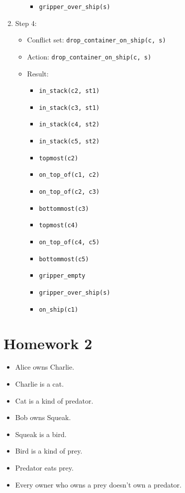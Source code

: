 \documentclass[12pt]{article}
\begin{document}
\begin{enumerate}
\begin{itemize}
\begin{itemize}
          \item \texttt{gripper\_over\_ship(s)}
        \end{itemize}
    \end{itemize}
  \item Step 4:
    \begin{itemize}
      \item Conflict set: \texttt{drop\_container\_on\_ship(c, s)}
      \item Action: \texttt{drop\_container\_on\_ship(c, s)}
      \item Result:
        \begin{itemize}
          \item \texttt{in\_stack(c2, st1)}
          \item \texttt{in\_stack(c3, st1)}
          \item \texttt{in\_stack(c4, st2)}
          \item \texttt{in\_stack(c5, st2)}
          \item \texttt{topmost(c2)}
          \item \texttt{on\_top\_of(c1, c2)}
          \item \texttt{on\_top\_of(c2, c3)}
          \item \texttt{bottommost(c3)}
          \item \texttt{topmost(c4)}
          \item \texttt{on\_top\_of(c4, c5)}
          \item \texttt{bottommost(c5)}
          \item \texttt{gripper\_empty}
          \item \texttt{gripper\_over\_ship(s)}
          \item \texttt{on\_ship(c1)}
        \end{itemize}
    \end{itemize}
\end{enumerate}
 

\newpage
\section{Homework 2}

\begin{itemize}
  \item Alice owns Charlie.
  \item Charlie is a cat.
  \item Cat is a kind of predator.
  \item Bob owns Squeak.
  \item Squeak is a bird.
  \item Bird is a kind of prey.
  \item Predator eats prey.
  \item Every owner who owns a prey doesn't own a predator.
\end{itemize}
\end{document}
